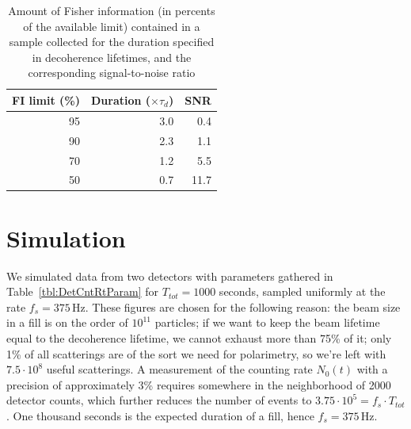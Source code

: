 \documentclass[a4paper]{jacow}
\newcommand{\vp}[2]{{#1}\cdot 10^{#2}}
\newcommand{\LTd}{\tau_d}
\begin{document}
\begin{table}[h]
	\caption{Amount of Fisher information (in percents of the available limit) contained in a sample collected for the duration specified in decoherence lifetimes, and the corresponding signal-to-noise ratio\label{tbl:FItot}}
	
	\centering
	\begin{tabular}{rrr}
		\hline
		FI limit (\%) & Duration ($\times\LTd$) & SNR  \\
		\hline
		95            & 3.0                     & 0.4         \\
		90            & 2.3                     & 1.1         \\
		70            & 1.2                     & 5.5         \\
		50            & 0.7                     & 11.7        \\
		\hline
	\end{tabular}
\end{table}

\section{Simulation}
We simulated data from two detectors with parameters gathered in Table~\ref{tbl:DetCntRtParam} for $T_{tot}=1000$ seconds, sampled uniformly at the rate $f_s = 375$\,Hz. These figures are chosen for the following reason: the beam size in a fill is on the order of $10^{11}$ particles; if we want to keep the beam lifetime equal to the decoherence lifetime, we cannot exhaust more than 75\% of it; only 1\% of all scatterings are of the sort we need for polarimetry, so we're left with $\vp{7.5}{8}$ useful scatterings. A measurement of the counting rate $N_0(t)$ with a precision of approximately 3\% requires somewhere in the neighborhood of 2000 detector counts, which further reduces the number of events to $\vp{3.75}{5}= f_s\cdot T_{tot}$. One thousand seconds is the expected duration of a fill, hence $f_s = 375$\,Hz. 
\end{document}
